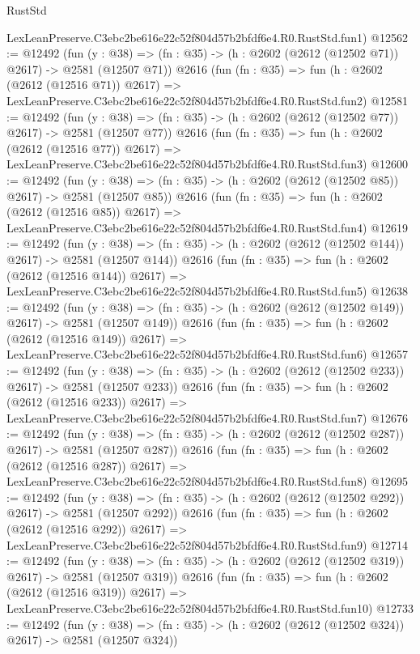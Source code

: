 \begin{lexlean}{RustStd}
\begin{coremodule}
    LexLeanPreserve.C3ebc2be616e22c52f804d57b2bfdf6e4.R0.RustStd.fun1)
@12562 := @12492
    (fun (y : @38) => (fn : @35) -> (h : @2602 (@2612 (@12502 @71)) @2617) -> @2581 (@12507 @71))
    @2616
    (fun (fn : @35) =>
    fun (h : @2602 (@2612 (@12516 @71)) @2617) =>
    LexLeanPreserve.C3ebc2be616e22c52f804d57b2bfdf6e4.R0.RustStd.fun2)
@12581 := @12492
    (fun (y : @38) => (fn : @35) -> (h : @2602 (@2612 (@12502 @77)) @2617) -> @2581 (@12507 @77))
    @2616
    (fun (fn : @35) =>
    fun (h : @2602 (@2612 (@12516 @77)) @2617) =>
    LexLeanPreserve.C3ebc2be616e22c52f804d57b2bfdf6e4.R0.RustStd.fun3)
@12600 := @12492
    (fun (y : @38) => (fn : @35) -> (h : @2602 (@2612 (@12502 @85)) @2617) -> @2581 (@12507 @85))
    @2616
    (fun (fn : @35) =>
    fun (h : @2602 (@2612 (@12516 @85)) @2617) =>
    LexLeanPreserve.C3ebc2be616e22c52f804d57b2bfdf6e4.R0.RustStd.fun4)
@12619 := @12492
    (fun (y : @38) => (fn : @35) -> (h : @2602 (@2612 (@12502 @144)) @2617) -> @2581 (@12507 @144))
    @2616
    (fun (fn : @35) =>
    fun (h : @2602 (@2612 (@12516 @144)) @2617) =>
    LexLeanPreserve.C3ebc2be616e22c52f804d57b2bfdf6e4.R0.RustStd.fun5)
@12638 := @12492
    (fun (y : @38) => (fn : @35) -> (h : @2602 (@2612 (@12502 @149)) @2617) -> @2581 (@12507 @149))
    @2616
    (fun (fn : @35) =>
    fun (h : @2602 (@2612 (@12516 @149)) @2617) =>
    LexLeanPreserve.C3ebc2be616e22c52f804d57b2bfdf6e4.R0.RustStd.fun6)
@12657 := @12492
    (fun (y : @38) => (fn : @35) -> (h : @2602 (@2612 (@12502 @233)) @2617) -> @2581 (@12507 @233))
    @2616
    (fun (fn : @35) =>
    fun (h : @2602 (@2612 (@12516 @233)) @2617) =>
    LexLeanPreserve.C3ebc2be616e22c52f804d57b2bfdf6e4.R0.RustStd.fun7)
@12676 := @12492
    (fun (y : @38) => (fn : @35) -> (h : @2602 (@2612 (@12502 @287)) @2617) -> @2581 (@12507 @287))
    @2616
    (fun (fn : @35) =>
    fun (h : @2602 (@2612 (@12516 @287)) @2617) =>
    LexLeanPreserve.C3ebc2be616e22c52f804d57b2bfdf6e4.R0.RustStd.fun8)
@12695 := @12492
    (fun (y : @38) => (fn : @35) -> (h : @2602 (@2612 (@12502 @292)) @2617) -> @2581 (@12507 @292))
    @2616
    (fun (fn : @35) =>
    fun (h : @2602 (@2612 (@12516 @292)) @2617) =>
    LexLeanPreserve.C3ebc2be616e22c52f804d57b2bfdf6e4.R0.RustStd.fun9)
@12714 := @12492
    (fun (y : @38) => (fn : @35) -> (h : @2602 (@2612 (@12502 @319)) @2617) -> @2581 (@12507 @319))
    @2616
    (fun (fn : @35) =>
    fun (h : @2602 (@2612 (@12516 @319)) @2617) =>
    LexLeanPreserve.C3ebc2be616e22c52f804d57b2bfdf6e4.R0.RustStd.fun10)
@12733 := @12492
    (fun (y : @38) => (fn : @35) -> (h : @2602 (@2612 (@12502 @324)) @2617) -> @2581 (@12507 @324))

\end{coremodule}
\end{lexlean}
